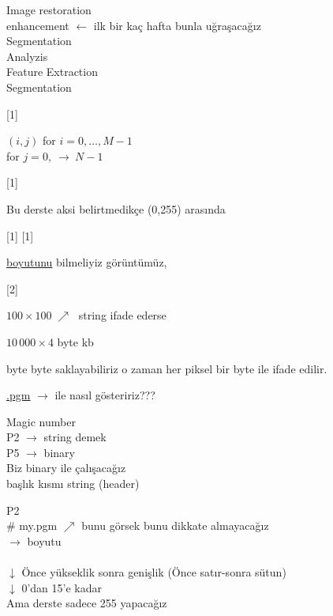 \documentclass[11pt,a4paper]{article}
\begin{document}

\noindent Image restoration\\
\hspace*{4em}enhancement $\leftarrow$ ilk bir kaç hafta bunla uğraşacağız\\
\hspace*{4em}Segmentation\\
\hspace*{4.5em}Analyzis\\
\hspace*{0.5em}Feature Extraction\\
\hspace*{6em}Segmentation

[1]

\noindent $(i,j)$ \qquad\quad for $i=0,\dots,M-1$\\
\hspace*{9em}for $j=0,\ \longrightarrow\ N-1$

[1]

Bu derste aksi belirtmedikçe (0,255) arasında 

[1]
[1]

\underline{boyutunu} bilmeliyiz görüntümüz,

[2]

$100 \times 100 \;\nearrow\;$ string ifade ederse

$10\,000 \times 4$ byte  kb

byte byte saklayabiliriz \quad o zaman her piksel bir byte ile ifade edilir.

\underline{\underline{.pgm}} $\rightarrow$ ile nasıl gösteririz???

\noindent Magic number\\
\hspace*{1em}P2 $\rightarrow$ string demek\\
\hspace*{1em}P5 $\rightarrow$ binary\\
\hspace*{1em}Biz binary ile çalışacağız\\
\hspace*{1em}başlık kısmı string (header)

\noindent P2\\
\# my.pgm \quad $\nearrow$ bunu görsek bunu dikkate almayacağız\\
 $\rightarrow$ boyutu\\
\\
$\downarrow$ Önce yükseklik sonra genişlik \quad (Önce satır-sonra sütun)\\
$\downarrow$ 0'dan 15'e kadar\\
Ama derste sadece 255 yapacağız
\end{document}
